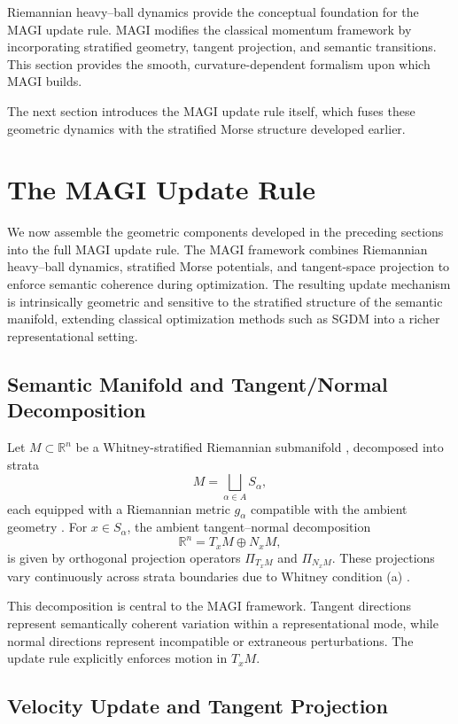 \documentclass[12pt]{article}
\begin{document}
Riemannian heavy–ball dynamics provide the conceptual foundation for the MAGI update rule. MAGI modifies the classical momentum framework by incorporating stratified geometry, tangent projection, and semantic transitions. This section provides the smooth, curvature-dependent formalism upon which MAGI builds.

The next section introduces the MAGI update rule itself, which fuses these geometric dynamics with the stratified Morse structure developed earlier.
\section{The MAGI Update Rule}

We now assemble the geometric components developed in the preceding sections into the full MAGI update rule. The MAGI framework combines Riemannian heavy–ball dynamics, stratified Morse potentials, and tangent-space projection to enforce semantic coherence during optimization. The resulting update mechanism is intrinsically geometric and sensitive to the stratified structure of the semantic manifold, extending classical optimization methods such as SGDM \citep{Polyak1964,Sutskever2013} into a richer representational setting.

\subsection*{Semantic Manifold and Tangent/Normal Decomposition}

Let $M \subset \mathbb{R}^n$ be a Whitney-stratified Riemannian submanifold \citep{Whitney1965,GoreskyMacPherson1988,Pflaum2000}, decomposed into strata
\[
M = \bigsqcup_{\alpha \in A} S_\alpha,
\]
each equipped with a Riemannian metric $g_\alpha$ compatible with the ambient geometry \citep{doCarmoRiemannian1992}. For $x \in S_\alpha$, the ambient tangent–normal decomposition
\[
\mathbb{R}^n = T_xM \oplus N_xM,
\]
is given by orthogonal projection operators $\Pi_{T_xM}$ and $\Pi_{N_xM}$. These projections vary continuously across strata boundaries due to Whitney condition (a) \citep{Whitney1965}.

This decomposition is central to the MAGI framework. Tangent directions represent semantically coherent variation within a representational mode, while normal directions represent incompatible or extraneous perturbations. The update rule explicitly enforces motion in $T_xM$.

\subsection*{Velocity Update and Tangent Projection}
\end{document}
